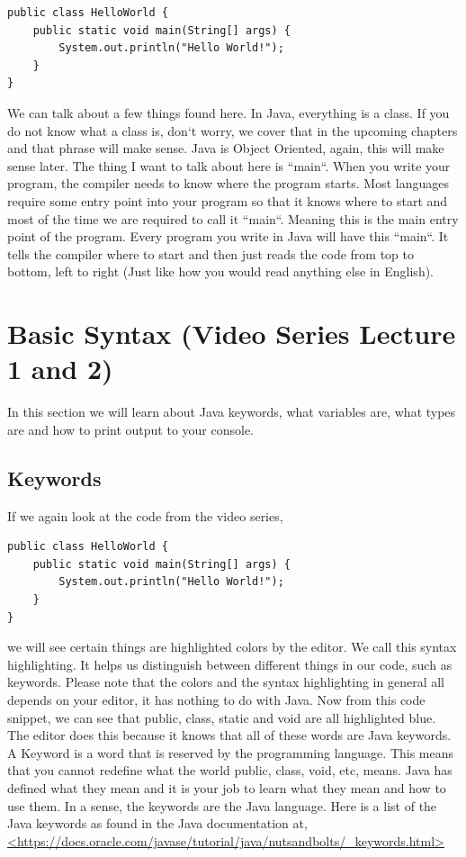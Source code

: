 \documentclass[11]{article}
\begin{document}
\begin{lstlisting}
public class HelloWorld {
    public static void main(String[] args) {
        System.out.println("Hello World!");
    }
}
\end{lstlisting}

We can talk about a few things found here. In Java, everything is a class. If you do not know what a class is, don`t worry, we cover that in the upcoming chapters and that phrase will make sense. Java is Object Oriented, again, this will make sense later. The thing I want to talk about here is ``main``. When you write your program, the compiler needs to know where the program starts. Most languages require some entry point into your program so that it knows where to start and most of the time we are required to call it ``main``. Meaning this is the main entry point of the program. Every program you write in Java will have this ``main``. It tells the compiler where to start and then just reads the code from top to bottom, left to right (Just like how you would read anything else in English).

\section{Basic Syntax (Video Series Lecture 1 and 2)}
In this section we will learn about Java keywords, what variables are, what types are and how to print output to your console.
\subsection{Keywords}
If we again look at the code from the video series,
\begin{lstlisting}
public class HelloWorld {
    public static void main(String[] args) {
        System.out.println("Hello World!");
    }
}
\end{lstlisting}
we will see certain things are highlighted colors by the editor. We call this syntax highlighting. It helps us distinguish between different things in our code, such as keywords. Please note that the colors and the syntax highlighting in general all depends on your editor, it has nothing to do with Java. Now from this code snippet, we can see that public, class, static and void are all highlighted blue. The editor does this because it knows that all of these words are Java keywords.\\

A Keyword is a word that is reserved by the programming language. This means that you cannot redefine what the world public, class, void, etc, means. Java has defined what they mean and it is your job to learn what they mean and how to use them. In a sense, the keywords are the Java language. Here is a list of the Java keywords as found in the Java documentation at, \url{<https://docs.oracle.com/javase/tutorial/java/nutsandbolts/_keywords.html>}
\end{document}
